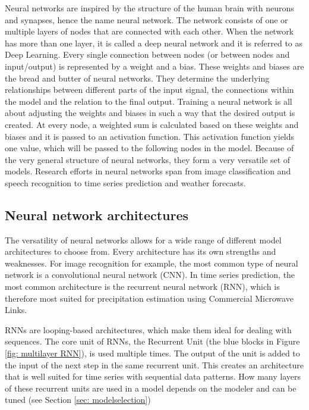 \documentclass[twocolumn, 10pt, a4paper]{memoir}
\begin{document}
	Neural networks are inspired by the structure of the human brain with neurons and synapses, hence the name neural network. The network consists of one or multiple layers of nodes that are connected with each other. When the network has more than one layer, it is called a deep neural network and it is referred to as Deep Learning. Every single connection between nodes (or between nodes and input/output) is represented by a weight and a bias. These weights and biases are the bread and butter of neural networks. They determine the underlying relationships between different parts of the input signal, the connections within the model and the relation to the final output. Training a neural network is all about adjusting the weights and biases in such a way that the desired output is created. At every node, a weighted sum is calculated based on these weights and biases and it is passed to an activation function. This activation function yields one value, which will be passed to the following nodes in the model.
	Because of the very general structure of neural networks, they form a very versatile set of models. Research efforts in neural networks span from image classification and speech recognition to time series prediction and weather forecasts.
	
	\subsection{Neural network architectures} \label{sec: NN architecture}
	The versatility of neural networks allows for a wide range of different model architectures to choose from. Every architecture has its own strengths and weaknesses. For image recognition for example, the most common type of neural network is a convolutional neural network (CNN). In time series prediction, the most common architecture is the recurrent neural network (RNN), which is therefore most suited for precipitation estimation using Commercial Microwave Links.
	
	RNNs are looping-based architectures, which make them ideal for dealing with sequences. The core unit of RNNs, the Recurrent Unit (the blue blocks in Figure \ref{fig: multilayer RNN}), is used multiple times. The output of the unit is added to the input of the next step in the same recurrent unit. This creates an architecture that is well suited for time series with sequential data patterns. How many layers of these recurrent units are used in a model depends on the modeler and can be tuned (see Section \ref{sec: modelselection})
	
\end{document}
